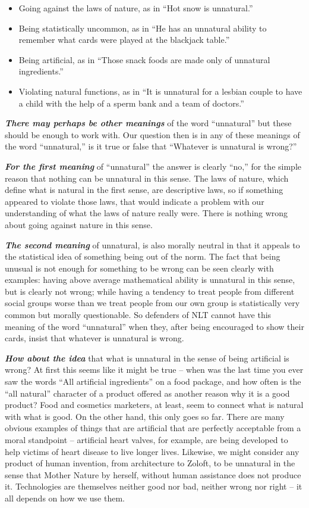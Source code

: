 \documentclass[12pt, openany]{book}
\providecommand{\tightlist}{%
  \setlength{\itemsep}{0pt}\setlength{\parskip}{0pt}}
\begin{document}
\begin{itemize}
\tightlist
\item
  Going against the laws of nature, as in ``Hot snow is unnatural.''
\item
  Being statistically uncommon, as in ``He has an unnatural ability to remember what cards were played at the blackjack table.''
\item
  Being artificial, as in ``Those snack foods are made only of unnatural ingredients.''
\item
  Violating natural functions, as in ``It is unnatural for a lesbian couple to have a child with the help of a sperm bank and a team of doctors.''
\end{itemize}

\textbf{\emph{There may perhaps be other meanings}} of the word ``unnatural'' but these should be enough to work with. Our question then is in any of these meanings of the word ``unnatural,'' is it true or false that ``Whatever is unnatural is wrong?''

\textbf{\emph{For the first meaning}} of ``unnatural'' the answer is clearly ``no,'' for the simple reason that nothing can be unnatural in this sense. The laws of nature, which define what is natural in the first sense, are descriptive laws, so if something appeared to violate those laws, that would indicate a problem with our understanding of what the laws of nature really were. There is nothing wrong about going against nature in this sense.

\textbf{\emph{The second meaning}} of unnatural, is also morally neutral in that it appeals to the statistical idea of something being out of the norm. The fact that being unusual is not enough for something to be wrong can be seen clearly with examples: having above average mathematical ability is unnatural in this sense, but is clearly not wrong; while having a tendency to treat people from different social groups worse than we treat people from our own group is statistically very common but morally questionable. So defenders of NLT cannot have this meaning of the word ``unnatural'' when they, after being encouraged to show their cards, insist that whatever is unnatural is wrong.

\textbf{\emph{How about the idea}} that what is unnatural in the sense of being artificial is wrong? At first this seems like it might be true -- when was the last time you ever saw the words ``All artificial ingredients'' on a food package, and how often is the ``all natural'' character of a product offered as another reason why it is a good product? Food and cosmetics marketers, at least, seem to connect what is natural with what is good. On the other hand, this only goes so far. There are many obvious examples of things that are artificial that are perfectly acceptable from a moral standpoint -- artificial heart valves, for example, are being developed to help victims of heart disease to live longer lives. Likewise, we might consider any product of human invention, from architecture to Zoloft, to be unnatural in the sense that Mother Nature by herself, without human assistance does not produce it. Technologies are themselves neither good nor bad, neither wrong nor right -- it all depends on how we use them.
\end{document}
